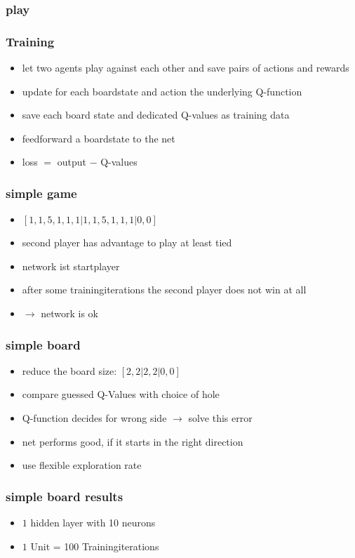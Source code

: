 \documentclass{beamer}
\begin{document}
 \begin{frame}
 \frametitle{play}
 
 \end{frame}
 
 
 \begin{frame}
 \frametitle{Training}
 \begin{itemize}
\item let two agents play against each other and save pairs of actions and rewards
\item update for each boardstate and action the underlying Q-function
\item save each board state and dedicated Q-values as training data
\item feedforward a boardstate to the net
\item loss $=$ output $-$ Q-values
\end{itemize}
 \end{frame}
 
 \begin{frame}
 \frametitle{simple game}
\begin{itemize}
\item $[1,1,5,1,1,1|1,1,5,1,1,1|0,0]$
\item second player has advantage to play at least tied
\item network ist startplayer
\item after some trainingiterations the second player does not win at all
\item $\rightarrow$ network is ok
\end{itemize}
 \end{frame}

 \begin{frame}
 \frametitle{simple board}
 \begin{itemize}
\item reduce the board size: $[2,2|2,2|0,0]$
\item compare guessed Q-Values with choice of hole
\item Q-function decides for wrong side $\rightarrow$ solve this error
\item net performs good, if it starts in the right direction
\item use flexible exploration rate
\end{itemize}
 \end{frame}

 \begin{frame}
 \frametitle{simple board results}
\begin{itemize}
\item $1$ hidden layer with 10 neurons
\item $1$ Unit = 100 Trainingiterations
\end{itemize}
 \end{frame}
\end{document}
